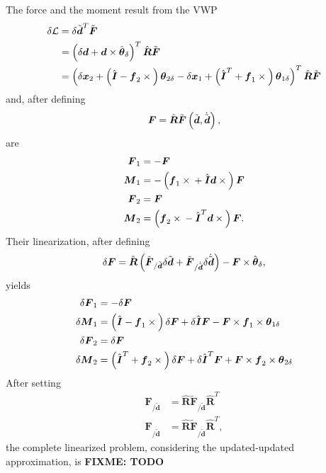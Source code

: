 \documentclass[10pt,dvips,fleqn]{report}
\newcommand{\T}[1]{\boldsymbol{#1}}
\begin{document}
The force and the moment result from the VWP
\begin{align}
	\delta\mathcal{L} &= \delta \tilde{\T{d}}^T \tilde{\T{F}} \\
	&= \plbr{
		\delta\T{d}
		+ \T{d} \times \hat{\T{\theta}}_{\delta}
	}^T \hat{\T{R}} \tilde{\T{F}} \\
	&= \plbr{
		\delta\T{x}_2
		+ \plbr{
			\hat{\T{I}}
			- \T{f}_2\times{}
		} \T{\theta}_{2\delta}
		- \delta\T{x}_1
		+ \plbr{
			\hat{\T{I}}^T
			+ \T{f}_1\times{}
		} \T{\theta}_{1\delta}
	}^T \hat{\T{R}} \tilde{\T{F}}
\end{align}
and,
after defining
\begin{equation}
	\T{F} = \hat{\T{R}}
		\tilde{\T{F}}\plbr{\tilde{\T{d}}, \dot{\tilde{\T{d}}}} ,
\end{equation}
 are
\begin{align}
	\T{F}_1 &= - \T{F} \\
	\T{M}_1 &= - \plbr{
		\T{f}_1 \times{}
		+ \hat{\T{I}} \T{d}\times{}
	} \T{F} \\
	\T{F}_2 &= \T{F} \\
	\T{M}_2 &= \plbr{
		\T{f}_2 \times{}
		- \hat{\T{I}}^T \T{d}\times{}
	} \T{F} .
\end{align}
Their linearization, after defining
\begin{equation}
	\delta\T{F} = \hat{\T{R}} \plbr{
		\tilde{\T{F}}_{/\tilde{\T{d}}} \delta{\tilde{\T{d}}}
		+ \tilde{\T{F}}_{/\dot{\tilde{\T{d}}}} \delta\dot{\tilde{\T{d}}}
	} - \T{F} \times \hat{\T{\theta}}_{\delta} ,
\end{equation}
yields
\begin{align}
	\delta\T{F}_1 &= - \delta\T{F} \\
	\delta\T{M}_1 &= \plbr{
		\hat{\T{I}}
		- \T{f}_1 \times{}
	} \delta\T{F}
	+ \delta\hat{\T{I}} \T{F} - \T{F} \times \T{f}_1 \times \T{\theta}_{1\delta} \\
	\delta\T{F}_2 &= \delta\T{F} \\
	\delta\T{M}_2 &= \plbr{
		\hat{\T{I}}^T
		+ \T{f}_2 \times{}
	} \delta\T{F}
	+ \delta\hat{\T{I}}^T \T{F} + \T{F} \times \T{f}_2 \times \T{\theta}_{2\delta}
\end{align}
After setting
\begin{align}
	\T{F}_{/\tilde{\T{d}}} &=
		\hat{\T{R}} \tilde{\T{F}}_{/\tilde{\T{d}}} \hat{\T{R}}^T \\
	\T{F}_{/\dot{\tilde{\T{d}}}} &=
		\hat{\T{R}} \tilde{\T{F}}_{/\dot{\tilde{\T{d}}}} \hat{\T{R}}^T
	,
\end{align}
the complete linearized problem, considering the updated-updated 
approximation, is
\textbf{FIXME: TODO}
\end{document}
